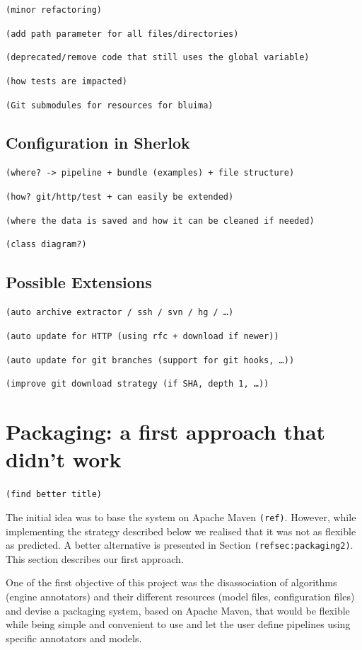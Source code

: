 \documentclass{article}
\newcommand{\TODO}[1]{\texttt{\textcolor{YellowOrange}{(#1)}}} %
\begin{document}
\TODO{minor refactoring}

\TODO{add path parameter for all files/directories}

\TODO{deprecated/remove code that still uses the global variable}

\TODO{how tests are impacted}

\TODO{Git submodules for resources for bluima}

\subsection{Configuration in Sherlok}
\label{sec:config_in_sherlok}

\TODO{where? -> pipeline + bundle (examples) + file structure}

\TODO{how? git/http/test + can easily be extended}

\TODO{where the data is saved and how it can be cleaned if needed}

\TODO{class diagram?}

\subsection{Possible Extensions}

\TODO{auto archive extractor / ssh / svn / hg / \dots}

\TODO{auto update for HTTP (using rfc + download if newer)}

\TODO{auto update for git branches (support for git hooks, \dots)}

\TODO{improve git download strategy (if SHA, depth 1, \dots)}

\section{Packaging: a first approach that didn't work}
\label{sec:packaging1}

\TODO{find better title}

The initial idea was to base the system on Apache Maven \TODO{ref}. However, while implementing the
strategy described below we realised that it was not as flexible as predicted. A better alternative
is presented in Section \TODO{ref{sec:packaging2}}. This section describes our first approach.

One of the first objective of this project was the disassociation of algorithms (engine annotators) and their different resources (model files, configuration files) and devise a packaging system, based on Apache Maven, that would be flexible while being simple and convenient to use and let the user define pipelines using specific annotators and models.
\end{document}
